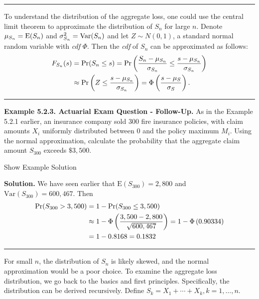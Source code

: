 \documentclass[]{book}
\theoremstyle{definition}
\theoremstyle{definition}
\theoremstyle{definition}
\theoremstyle{remark}
\begin{document}
\begin{center}\rule{0.5\linewidth}{\linethickness}\end{center}

To understand the distribution of the aggregate loss, one could use the
central limit theorem to approximate the distribution of \(S_n\) for
large \(n\). Denote \(\mu_{S_n}={\rm E}(S_n)\) and
\(\sigma^2_{S_n}={\rm Var}(S_n)\) and let \(Z\sim N(0,1)\), a standard
normal random variable with \emph{cdf} \(\Phi\). Then the \emph{cdf} of
\(S_n\) can be approximated as follows: \[\begin{aligned}
 F_{S_n}(s) &= {\rm Pr}({S_n}\leq s) = \Pr \left( \frac{S_n - \mu_{S_n}}{\sigma_{S_n}} \leq \frac{s-\mu_{S_n}}{\sigma_{S_n}} \right) \\
 &\approx \Pr\left( Z \leq \frac{s-\mu_{S_n}}{\sigma_{S_n}} \right) = \Phi \left(\frac{s-\mu_S}{\sigma_S}\right).
\end{aligned}\]

\begin{center}\rule{0.5\linewidth}{\linethickness}\end{center}

\textbf{Example 5.2.3. Actuarial Exam Question - Follow-Up.} As in the
Example 5.2.1 earlier, an insurance company sold 300 fire insurance
policies, with claim amounts \(X_i\) uniformly distributed between 0 and
the policy maximum \(M_i\). Using the normal approximation, calculate
the probability that the aggregate claim amount \(S_{300}\) exceeds
\(\$3,500\).

Show Example Solution

\hypertarget{toggleExampleAggLoss.2.3}{}
\textbf{Solution.} We have seen earlier that
\(\mathrm{E}(S_{300})=2,800\) and \(\mathrm{Var}(S_{300}) = 600,467\).
Then \[\begin{aligned}
{\rm Pr}(S_{300} > 3,500) &= 1 - {\rm Pr}(S_{300} \leq 3,500) \\
&\approx 1- \Phi \left( \frac{3,500-2,800}{\sqrt{600,467}} \right) = 1 - \Phi \left( 0.90334 \right) \\
&= 1 - 0.8168 = 0.1832
\end{aligned}\]

\begin{center}\rule{0.5\linewidth}{\linethickness}\end{center}

For small \(n\), the distribution of \(S_n\) is likely skewed, and the
normal approximation would be a poor choice. To examine the aggregate
loss distribution, we go back to the basics and first principles.
Specifically, the distribution can be derived recursively. Define
\(S_k=X_1 + \cdots + X_k, k=1,\ldots,n\).
\end{document}
